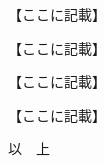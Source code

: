 \documentclass{ltjsarticle}
\begin{document}








\SecB{}

【ここに記載】

\SecB{}

【ここに記載】



\SecB{}

【ここに記載】

\SecB{}

【ここに記載】






\vspace{2\zw}

\begin{flushright}
以　上
\end{flushright}
\end{document}
